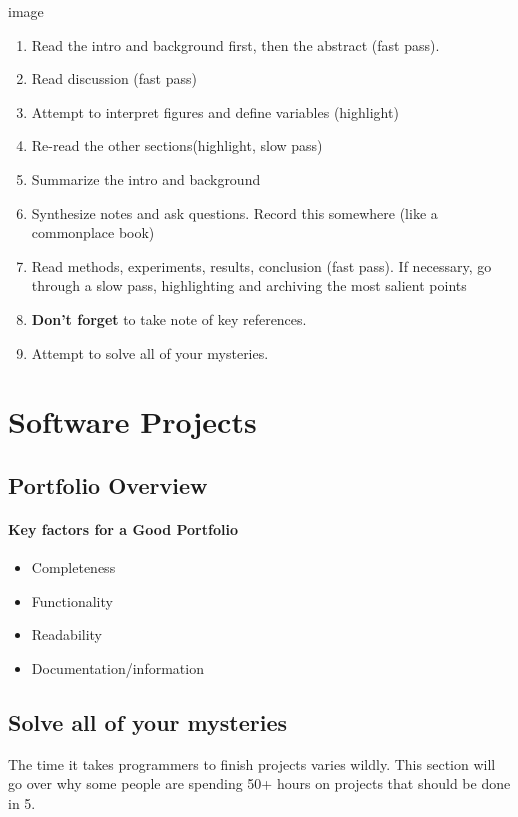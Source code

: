  image

\begin{enumerate}
\item Read the intro and background first, then the abstract (fast pass).
\item Read discussion (fast pass)
\item Attempt to interpret figures and define variables (highlight)
\item Re-read the other sections(highlight, slow pass)
\item Summarize the intro and background
\item Synthesize notes and ask questions. Record this somewhere (like a commonplace book)
\item Read methods, experiments, results, conclusion (fast pass). If necessary, go through a slow pass, highlighting and archiving the most salient points
\item \textbf{Don't forget} to take note of key references.
\item Attempt to solve all of your mysteries.
\end{enumerate}


\section{Software Projects}


\subsection{Portfolio Overview}

\paragraph*{Key factors for a Good Portfolio}
\begin{itemize}
	\item Completeness
	\item Functionality
	\item Readability
	\item Documentation/information
\end{itemize}

\subsection{Solve all of your mysteries}

The time it takes programmers to finish projects varies wildly. This section will go over why some people are spending 50+ hours on projects that should be done in 5.


